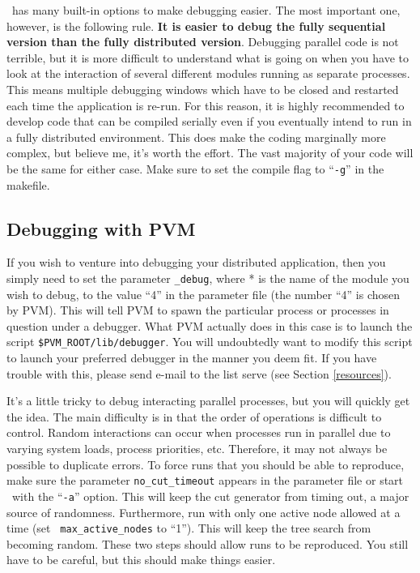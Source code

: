 \BB\ has many built-in options to make debugging easier. The most
important one, however, is the following rule. {\bf It is easier to
debug the fully sequential version than the fully distributed
version}. Debugging parallel code is not terrible, but it is more
difficult to understand what is going on when you have to look at the
interaction of several different modules running as separate
processes. This means multiple debugging windows which have to be
closed and restarted each time the application is re-run. For this
reason, it is highly recommended to develop code that can be compiled
serially even if you eventually intend to run in a fully distributed
environment. This does make the coding marginally more complex, but
believe me, it's worth the effort. The vast majority of your code will
be the same for either case. Make sure to set the compile flag to
``{\tt -g}'' in the makefile.

\subsection{Debugging with PVM}
\label{debugging-PVM}
If you wish to venture into debugging your distributed application,
then you simply need to set the parameter {\tt *\_debug}, where * is
the name of the module you wish to debug, 
to the value ``4'' in the parameter file (the number ``4'' is chosen
by PVM). This will tell PVM to spawn the particular process or
processes in question under a debugger. What PVM actually does in this
case is to launch the script {\tt \$PVM\_ROOT/lib/debugger}. You will
undoubtedly want to modify this script to launch your preferred
debugger in the manner you deem fit. If you have trouble with this,
please send e-mail to the list serve (see Section \ref{resources}).

It's a little tricky to debug interacting parallel processes, but you
will quickly get the idea. The main difficulty is in that the order of
operations is difficult to control. Random interactions can occur when
processes run in parallel due to varying system loads, process
priorities, etc. Therefore, it may not always be possible to duplicate
errors. To force runs that you should be able to reproduce, make sure
the parameter {\tt no\_cut\_timeout} appears in the parameter file or
start \BB\ with the ``{\tt -a}'' option. This will keep the cut
generator from timing out, a major source of randomness. Furthermore,
run with only one active node allowed at a time (set {\tt
max\_active\_nodes} to ``1''). This will keep the tree search from
becoming random. These two steps should allow runs to be reproduced.
You still have to be careful, but this should make things easier.

